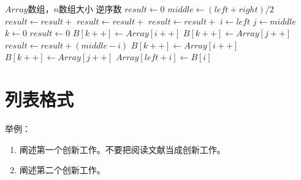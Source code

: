 \documentclass{cqupt_thesis}
\begin{document}
    \begin{algorithm}[H]

        \label{用归并排序求逆序数}
        \caption{用归并排序求逆序数}
        \begin{algorithmic}[1] %
            \Require $Array$数组，$n$数组大小
            \Ensure 逆序数
                \State $result \gets 0$
                    \State $middle \gets (left + right) / 2$
                    \State $result \gets result +$ 
                    \State $result \gets result +$ 
                    \State $result \gets result +$ 
                \EndIf
                \State {}
            \EndFunction
            \State
                \State $i\gets left$
                \State $j\gets middle$
                \State $k\gets 0$
                \State $result \gets 0$
                        \State $B[k++]\gets Array[i++]$
                    \Else
                        \State $B[k++] \gets Array[j++]$
                        \State $result \gets result + (middle - i)$
                    \EndIf
                \EndWhile
                    \State $B[k++] \gets Array[i++]$
                \EndWhile
                    \State $B[k++] \gets Array[j++]$
                \EndWhile
                    \State $Array[left + i] \gets B[i]$
                \EndFor
                \State {}
            \EndFunction
        \end{algorithmic}
    \end{algorithm}


    \section{列表格式}
    举例：
    \begin{enumerate}[align=left, leftmargin=0pt, labelindent=\parindent, listparindent=\parindent, labelwidth=0pt, itemindent=!
    ]
        \item 阐述第一个创新工作。不要把阅读文献当成创新工作。
        \item 阐述第二个创新工作。
    \end{enumerate}
\end{document}
